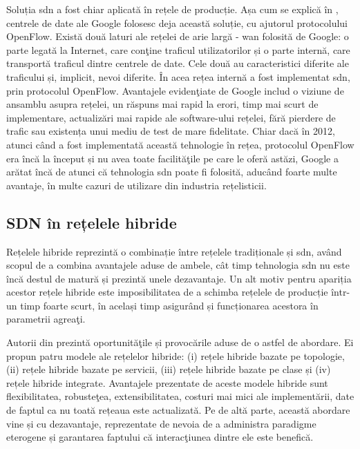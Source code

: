 Soluția \gls{sdn} a fost chiar aplicată în rețele de producție. Așa cum se explică în \cite{google_casestudy}, centrele de date ale Google folosesc deja această soluție, cu ajutorul protocolului OpenFlow. Există două laturi ale rețelei de arie largă - \gls{wan} folosită de Google: o parte legată la Internet, care conţine traficul utilizatorilor și o parte internă, care transportă traficul dintre centrele de date. Cele două au caracteristici diferite ale traficului și, implicit, nevoi diferite. În acea rețea internă a fost implementat \gls{sdn}, prin protocolul OpenFlow. Avantajele evidenţiate de Google includ o viziune de ansamblu asupra rețelei, un răspuns mai rapid la erori, timp mai scurt de implementare, actualizări mai rapide ale software-ului rețelei, fără pierdere de trafic sau existența unui mediu de test de mare fidelitate. Chiar dacă în 2012, atunci când a fost implementată această tehnologie în rețea, protocolul OpenFlow era încă la început și nu avea toate facilităţile pe care le oferă astăzi, Google a arătat încă de atunci că tehnologia \gls{sdn} poate fi folosită, aducând foarte multe avantaje, în multe cazuri de utilizare din industria rețelisticii.

\subsection{SDN în rețelele hibride}

Rețelele hibride reprezintă o combinație între rețelele tradiționale și \gls{sdn}, având scopul de a combina avantajele aduse de ambele, cât timp tehnologia \gls{sdn} nu este încă destul de matură și prezintă unele dezavantaje. Un alt motiv pentru apariția acestor rețele hibride este imposibilitatea de a schimba rețelele de producție într-un timp foarte scurt, în același timp asigurând și funcționarea acestora în parametrii agreaţi.

Autorii din \cite{vissicchio2014opportunities} prezintă oportunităţile și provocările aduse de o astfel de abordare. Ei propun patru modele ale rețelelor hibride: (i) rețele hibride bazate pe topologie, (ii) rețele hibride bazate pe servicii, (iii) rețele hibride bazate pe clase și (iv) rețele hibride integrate. Avantajele prezentate de aceste modele hibride sunt flexibilitatea, robusteţea, extensibilitatea, costuri mai mici ale implementării, date de faptul ca nu toată rețeaua este actualizată. Pe de altă parte, această abordare vine și cu dezavantaje, reprezentate de nevoia de a administra paradigme eterogene și garantarea faptului că interacţiunea dintre ele este benefică.


